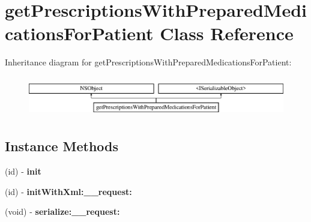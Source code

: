 \hypertarget{interfaceget_prescriptions_with_prepared_medications_for_patient}{}\section{get\+Prescriptions\+With\+Prepared\+Medications\+For\+Patient Class Reference}
\label{interfaceget_prescriptions_with_prepared_medications_for_patient}
Inheritance diagram for get\+Prescriptions\+With\+Prepared\+Medications\+For\+Patient\+:\begin{figure}[H]
\begin{center}
\leavevmode
\includegraphics[height=1.783440cm]{interfaceget_prescriptions_with_prepared_medications_for_patient}
\end{center}
\end{figure}
\subsection*{Instance Methods}
\begin{DoxyCompactItemize}
\item 
\hypertarget{interfaceget_prescriptions_with_prepared_medications_for_patient_aededf1a53c1a044f4127ced8b4657e0e}{}(id) -\/ {\bfseries init}\label{interfaceget_prescriptions_with_prepared_medications_for_patient_aededf1a53c1a044f4127ced8b4657e0e}

\item 
\hypertarget{interfaceget_prescriptions_with_prepared_medications_for_patient_a9389c1589ea9a581daaf5eafaf308319}{}(id) -\/ {\bfseries init\+With\+Xml\+:\+\_\+\+\_\+request\+:}\label{interfaceget_prescriptions_with_prepared_medications_for_patient_a9389c1589ea9a581daaf5eafaf308319}

\item 
\hypertarget{interfaceget_prescriptions_with_prepared_medications_for_patient_a74bb98d64b7427cc21afce90bc5ae8e4}{}(void) -\/ {\bfseries serialize\+:\+\_\+\+\_\+request\+:}\label{interfaceget_prescriptions_with_prepared_medications_for_patient_a74bb98d64b7427cc21afce90bc5ae8e4}

\end{DoxyCompactItemize}
